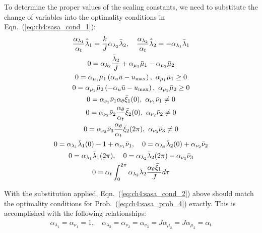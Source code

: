 \noindent To determine the proper values of the scaling constants, we need to substitute the change of variables into the optimality conditions in Eqn.~(\ref{eq:ch4:sasa_cond_1}):
\begingroup
\allowdisplaybreaks
\begin{subequations}
\label{eq:ch4:sasa_cond_2}
\begin{gather}
\frac{\alpha_{\lambda_1}}{\alpha_t} \dot{\mybar{\lambda}}_1 = \frac{k}{J} \alpha_{\lambda_2} \mybar{\lambda}_2, \quad \frac{\alpha_{\lambda_2}}{\alpha_t} \dot{\mybar{\lambda}}_2 = -\alpha_{\lambda_1} \mybar{\lambda}_1  \\
0 = \alpha_{\lambda_2} \frac{\mybar{\lambda}_2}{J} + \alpha_{\mu_1} \mybar{\mu}_1 - \alpha_{\mu_2} \mybar{\mu}_2 \\
0 = \alpha_{\mu_1} \mybar{\mu}_1 \left( \alpha_u \bar{u} - u_{\max} \right), \ \alpha_{\mu_1} \mybar{\mu}_1 \geq 0 \\
 0 =  \alpha_{\mu_2}  \mybar{\mu}_2 \left( -\alpha_u \bar{u} - u_{\max} \right), \ \alpha_{\mu_2} \mybar{\mu}_2 \geq 0 \\
0 = \alpha_{\nu_1} \mybar{\nu}_1 \alpha_\theta \mybar{\xi}_1(0), \ \alpha_{\nu_1} \mybar{\nu}_1 \neq 0 \\
0 = \alpha_{\nu_2} \mybar{\nu}_2 \frac{\alpha_\theta}{\alpha_t} \mybar{\xi}_2(0), \ \alpha_{\nu_2} \mybar{\nu}_2 \neq 0    \\
0 = \alpha_{\nu_3} \mybar{\nu}_3 \frac{\alpha_\theta}{\alpha_t} \mybar{\xi}_2(2\pi), \ \alpha_{\nu_3} \mybar{\nu}_3 \neq 0 \\
0 = \alpha_{\lambda_1} \mybar{\lambda}_1(0) - 1 + \alpha_{\nu_1} \mybar{\nu}_1, \quad 0 = \alpha_{\lambda_2} \mybar{\lambda}_2(0) + \alpha_{\nu_2} \mybar{\nu}_2 \\
0 = \alpha_{\lambda_1} \mybar{\lambda}_1(2\pi), \quad 0 = \alpha_{\lambda_2} \mybar{\lambda}_2(2\pi) - \alpha_{\nu_3} \mybar{\nu}_3 \\
0 = \alpha_t \int_0^{2\pi} \alpha_{\lambda_2}  \mybar{\lambda}_2 \frac{\alpha_\theta \mybar{\xi}_1}{J} d\tau
\end{gather}
\end{subequations}%
\endgroup

\noindent With the substitution applied, Eqn.~(\ref{eq:ch4:sasa_cond_2}) above should match the optimality conditions for Prob.~(\ref{eq:ch4:sasa_prob_4}) exactly.
This is accomplished with the following relationships:
\begin{align}
\alpha_{\lambda_1} = \alpha_{\nu_1}= 1, \quad \alpha_{\lambda_2} = \alpha_{\nu_2} = \alpha_{\nu_3} = J \alpha_{\mu_2} = J \alpha_{\mu_2} = \alpha_t
\end{align}

